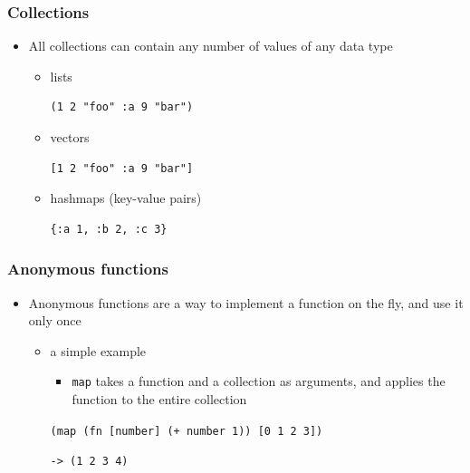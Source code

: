 \documentclass{beamer}
\begin{document}
\begin{frame}[fragile]
\frametitle{Collections}
    \begin{itemize}
         \item All collections can contain any number of values of any data type
         
	 \begin{itemize}
	   \item lists
	   
	   \begin{verbatim}(1 2 "foo" :a 9 "bar")
	   \end{verbatim}
	   
  	   \item vectors
  	   
  	   \begin{verbatim}[1 2 "foo" :a 9 "bar"]
	   \end{verbatim}
  	   \item hashmaps (key-value pairs)
  	   
  	   \begin{verbatim}{:a 1, :b 2, :c 3}
	   \end{verbatim}
	 \end{itemize}
    \end{itemize}
\end{frame}

\begin{frame}[fragile]
\frametitle{Anonymous functions}
	\begin{itemize}
  	  \item Anonymous functions are a way to implement a function on the fly, and use it only once
  	  \begin{itemize}
  	    \item a simple example
  	    \begin{itemize}
  	 	  \item \texttt{map} takes a function and a collection as arguments, and applies the function to the entire collection
  	    \end{itemize}
  	    
		\texttt{(map (fn [number] (+ number 1)) [0 1 2 3])}
		
		\texttt{-> (1 2 3 4)}
	 \end{itemize}
   \end{itemize}
\end{frame}
\end{document}
